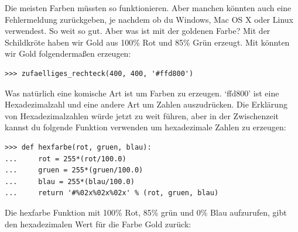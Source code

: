 Die meisten Farben müssten so funktionieren. Aber manchen könnten auch eine Fehlermeldung zurückgeben, je nachdem ob du Windows, Mac OS X oder Linux verwendest. So weit so gut. Aber was ist mit der goldenen Farbe? Mit der Schildkröte haben wir Gold aus 100\% Rot und 85\% Grün erzeugt. Mit  könnten wir Gold folgendermaßen erzeugen:

\begin{Verbatim}[frame=single]
>>> zufaelliges_rechteck(400, 400, '#ffd800')
\end{Verbatim}

Was natürlich eine komische Art ist um Farben zu erzeugen. `ffd800' ist eine Hexadezimalzahl und eine andere Art um Zahlen auszudrücken. Die Erklärung von Hexadezimalzahlen würde jetzt zu weit führen, aber in der Zwischenzeit kannst du folgende Funktion verwenden um hexadezimale Zahlen zu erzeugen:

\begin{Verbatim}[frame=single]
>>> def hexfarbe(rot, gruen, blau):
...     rot = 255*(rot/100.0)
...     gruen = 255*(gruen/100.0)
...     blau = 255*(blau/100.0)
...     return '#%02x%02x%02x' % (rot, gruen, blau)
\end{Verbatim}

Die hexfarbe Funktion mit 100\% Rot, 85\% grün und 0\% Blau aufzurufen, gibt den hexadezimalen Wert für die Farbe Gold zurück:

